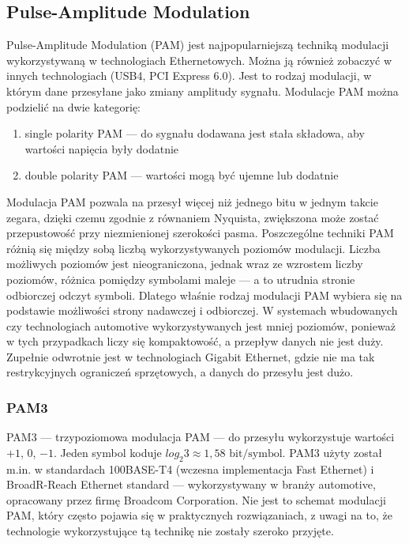\subsection{Pulse-Amplitude Modulation}

Pulse-Amplitude Modulation (PAM) jest najpopularniejszą techniką modulacji wykorzystywaną w technologiach Ethernetowych. Można ją również zobaczyć w innych technologiach (USB4, PCI Express 6.0). Jest to rodzaj modulacji, w którym dane przesyłane jako zmiany amplitudy sygnału. Modulacje PAM można podzielić na dwie kategorię:

\begin{enumerate}
    \item single polarity PAM --- do sygnału dodawana jest stała składowa, aby wartości napięcia były dodatnie
    \item double polarity PAM --- wartości mogą być ujemne lub dodatnie
\end{enumerate}

Modulacja PAM pozwala na przesył więcej niż jednego bitu w jednym takcie zegara, dzięki czemu zgodnie z równaniem Nyquista, zwiększona może zostać przepustowość przy niezmienionej szerokości pasma.
Poszczególne techniki PAM różnią się między sobą liczbą wykorzystywanych poziomów modulacji. Liczba możliwych poziomów jest nieograniczona, jednak wraz ze wzrostem liczby poziomów, różnica pomiędzy symbolami maleje --- a to utrudnia stronie odbiorczej odczyt symboli. Dlatego właśnie rodzaj modulacji PAM wybiera się na podstawie możliwości strony nadawczej i odbiorczej. W systemach wbudowanych czy technologiach automotive wykorzystywanych jest mniej poziomów,
ponieważ w tych przypadkach liczy się kompaktowość, a przepływ danych nie jest duży. Zupełnie odwrotnie jest w technologiach Gigabit Ethernet, gdzie nie ma tak restrykcyjnych ograniczeń sprzętowych, a danych do przesyłu jest dużo.

\subsubsection{PAM3}

PAM3 --- trzypoziomowa modulacja PAM --- do przesyłu wykorzystuje wartości $+1$, $0$, $-1$. Jeden symbol koduje $log_{2}{3} \approx 1,58 \text{ bit/symbol}$.
PAM3 użyty został m.in. w standardach 100BASE-T4 (wczesna implementacja Fast Ethernet) i BroadR-Reach Ethernet standard --- wykorzystywany w branży automotive, opracowany przez firmę Broadcom Corporation.
Nie jest to schemat modulacji PAM, który często pojawia się w praktycznych rozwiązaniach, z uwagi na to, że technologie wykorzystujące tą technikę nie zostały szeroko przyjęte.

